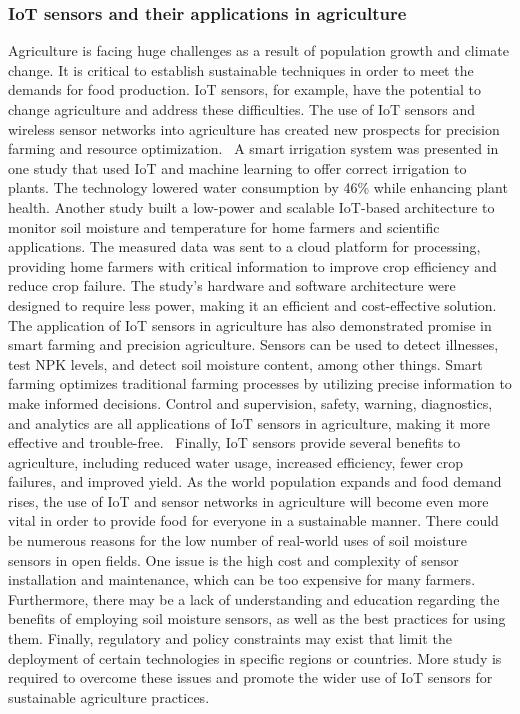 \documentclass[11pt]{scrartcl} %
\begin{document}
\subsubsection{IoT sensors and their applications in agriculture}
Agriculture is facing huge challenges as a result of population growth and climate change. It is critical to establish sustainable techniques in order to meet the demands for food production. IoT sensors, for example, have the potential to change agriculture and address these difficulties. The use of IoT sensors and wireless sensor networks into agriculture has created new prospects for precision farming and resource optimization.~\parencite{capacitive_sensors_for_irrigation_and_disease}
\newline A smart irrigation system was presented in one study that used IoT and machine learning to offer correct irrigation to plants. The technology lowered water consumption by 46\% while enhancing plant health. Another study built a low-power and scalable IoT-based architecture to monitor soil moisture and temperature for home farmers and scientific applications. The measured data was sent to a cloud platform for processing, providing home farmers with critical information to improve crop efficiency and reduce crop failure. The study's hardware and software architecture were designed to require less power, making it an efficient and cost-effective solution.~\parencites{precision_irrigation_iot}{capacitive_sensors_for_irrigation_and_disease}
\newline The application of IoT sensors in agriculture has also demonstrated promise in smart farming and precision agriculture. Sensors can be used to detect illnesses, test NPK levels, and detect soil moisture content, among other things. Smart farming optimizes traditional farming processes by utilizing precise information to make informed decisions. Control and supervision, safety, warning, diagnostics, and analytics are all applications of IoT sensors in agriculture, making it more effective and trouble-free.~\parencite{iot_and_sensors_in_agriculture_general}
\newline Finally, IoT sensors provide several benefits to agriculture, including reduced water usage, increased efficiency, fewer crop failures, and improved yield. As the world population expands and food demand rises, the use of IoT and sensor networks in agriculture will become even more vital in order to provide food for everyone in a sustainable manner.\parencite{capacitive_sensors_for_irrigation_and_disease,bwambale2022smart}
\newline There could be numerous reasons for the low number of real-world uses of soil moisture sensors in open fields. One issue is the high cost and complexity of sensor installation and maintenance, which can be too expensive for many farmers. Furthermore, there may be a lack of understanding and education regarding the benefits of employing soil moisture sensors, as well as the best practices for using them. Finally, regulatory and policy constraints may exist that limit the deployment of certain technologies in specific regions or countries. More study is required to overcome these issues and promote the wider use of IoT sensors for sustainable agriculture practices.
\end{document}
